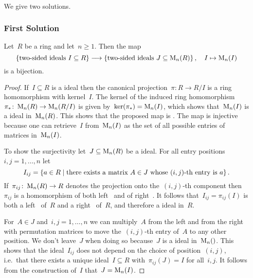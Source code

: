 \section{}





\subsection{}
\label{ideals in matrix rings}


We give two solutions.



\subsubsection{First Solution}


\begin{lemma}
  Let~$R$ be a ring and let~$n \geq 1$.
  Then the map
  \[
            \{ \text{{\twosided} ideals~$I \subseteq R$} \}
    \longto \{ \text{{\twosided} ideals~$J \subseteq \mat{n}{R}$} \} \,,
    \quad   I
    \mapsto \mat{n}{I}
  \]
  is a {\welldef} bijection.
\end{lemma}


\begin{proof}
  If~$I \subseteq R$ is a {\twosided} ideal then the canonical projection~$\pi \colon R \to R/I$ is a ring homomorphism with kernel~$I$.
  The kernel of the induced ring homomorphism~$\pi_* \colon \operatorname{M}_{n}(R) \to \operatorname{M}_{n}(R/I)$ is given by~$\ker(\pi_*) = \operatorname{M}_{n}(I)$, which shows that~$\operatorname{M}_{n}(I)$ is a {\twosided} ideal in~$\operatorname{M}_{n}(R)$.
  This shows that the proposed map is {\welldef}.
  The map is injective because one can retrieve~$I$ from~$\operatorname{M}_{n}(I)$ as the set of all possible entries of matrices in~$\operatorname{M}_{n}(I)$.
  
  To show the surjectivity let~$J \subseteq \operatorname{M}_{n}(R)$ be a {\twosided} ideal.
  For all entry positions~$i,j = 1, \dotsc, n$ let
  \[
      I_{ij}
    = \{
        a \in R
      \suchthat
        \text{there exists a matrix~$A \in J$ whose~$(i,j)$-th entry is~$a$}
      \} \,.
  \]
  If~$\pi_{ij} \colon \operatorname{M}_{n}(R) \to R$ denotes the projection onto the~$(i,j)$-th component then~$\pi_{ij}$ is a homomorphism of both left~{} and of right~{}.
  It follows that~$I_{ij} = \pi_{ij}(I)$ is both a left~{} of~$R$ and a right~{} of~$R$, and therefore a {\twosided} ideal in~$R$.
  
  For~$A \in J$ and~$i, j = 1, \dotsc, n$ we can multiply~$A$ from the left and from the right with permutation matrices to move the~$(i,j)$-th entry of~$A$ to any other position.
  We don’t leave~$J$ when doing so because~$J$ is a {\twosided} ideal in~$\mat{n}$.
  This shows that the {\twosided} ideal~$I_{ij}$ does not depend on the choice of position~$(i,j)$, i.e.\ that there exists a unique {\twosided} ideal~$I \subseteq R$ with~$\pi_{ij}(J) = I$ for all~$i,j$.
  It follows from the construction of~$I$ that~$J = \operatorname{M}_{n}(I)$.
\end{proof}


